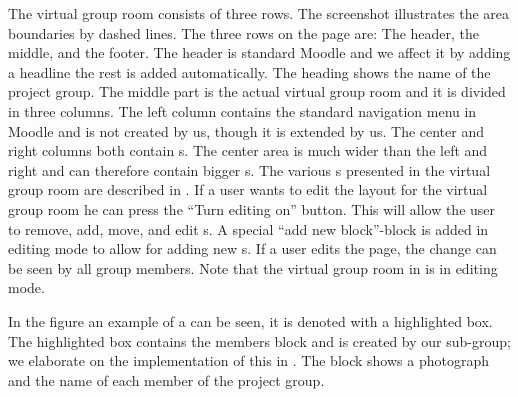 The virtual group room consists of three rows.
The screenshot illustrates the area boundaries by dashed lines. 
The three rows on the page are: The header, the middle, and the footer. 
The header is standard Moodle and we affect it by adding a headline the rest is added automatically.
The heading shows the name of the project group. 
The middle part is the actual virtual group room and it is divided in three columns. 
The left column contains the standard navigation menu in Moodle and is not created by us, though it is extended by us.
The center and right columns both contain \block{}s.
The center area is much wider than the left and right and can therefore contain bigger \block{}s. 
The various \block{}s presented in the virtual group room are described in . 
If a user wants to edit the layout for the virtual group room he can press the ``Turn editing on'' button. 
This will allow the user to remove, add, move, and edit \block{}s. 
A special ``add new block''-block is added in editing mode to allow for adding new \block{}s. 
If a user edits the page, the change can be seen by all group members. 
Note that the virtual group room in  is in editing mode.

In the figure an example of a \block{} can be seen, it is denoted with a highlighted box.
The highlighted box contains the members block and is created by our sub-group; we elaborate on the implementation of this in . 
The block shows a photograph and the name of each member of the project group. 



